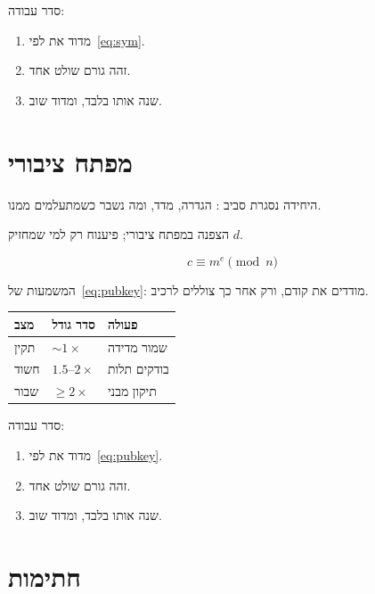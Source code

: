 סדר עבודה:
\begin{enumerate}
\item[(\textbf{א})] מדוד את  לפי~\eqref{eq:sym}.
\item[(\textbf{ב})] זהה גורם שולט אחד.
\item[(\textbf{ג})] שנה אותו בלבד, ומדוד שוב.
\end{enumerate}

\chapter{מפתח ציבורי}
\label{ch:pubkey}

היחידה נסגרת סביב : הגדרה, מדד, ומה נשבר כשמתעלמים ממנו.

\begin{keybox}[frametitle={רעיון מפתח — מפתח ציבורי}]
הצפנה במפתח ציבורי; פיענוח רק למי שמחזיק $d$.
\end{keybox}

\begin{equation}
\label{eq:pubkey}
c \equiv m^e \pmod n
\end{equation}

המשמעות של~\eqref{eq:pubkey}: מודדים את  קודם, ורק אחר כך צוללים לרכיב.

\begin{tablebox}\centering\small
\begin{tabular}{@{}lll@{}}
\toprule
\textbf{מצב} & \textbf{סדר גודל} & \textbf{פעולה}\\
\midrule
תקין & $\sim 1\times$ & שמור מדידה\\
חשוד & $1.5$–$2\times$ & בודקים תלות\\
שבור & $\ge 2\times$ & תיקון מבני\\
\bottomrule
\end{tabular}
\end{tablebox}

סדר עבודה:
\begin{enumerate}
\item[(\textbf{א})] מדוד את  לפי~\eqref{eq:pubkey}.
\item[(\textbf{ב})] זהה גורם שולט אחד.
\item[(\textbf{ג})] שנה אותו בלבד, ומדוד שוב.
\end{enumerate}

\chapter{חתימות}
\label{ch:sig}

